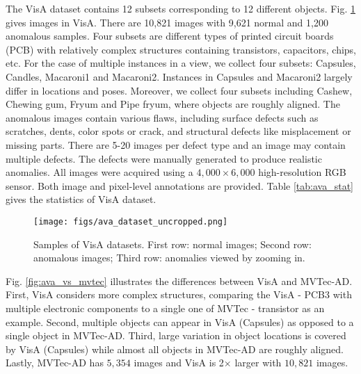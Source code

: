 \documentclass[runningheads]{llncs}
\begin{document}
The VisA dataset contains 12 subsets corresponding to 12 different objects. Fig. \ref{fig:ava_samples} gives images in VisA. There are 10,821 images with 9,621 normal and 1,200 anomalous samples. Four subsets are different types of printed circuit boards (PCB) with relatively complex structures containing transistors, capacitors, chips, etc. For the case of multiple instances in a view, we collect four subsets: Capsules, Candles, Macaroni1 and Macaroni2. Instances in Capsules and Macaroni2 largely differ in locations and poses. Moreover, we collect four subsets including Cashew, Chewing gum, Fryum and Pipe fryum, where objects are roughly aligned. The anomalous images contain various flaws, including surface defects such as scratches, dents, color spots or crack, and structural defects like misplacement or missing parts. There are 5-20 images per defect type and an image may contain multiple defects. The defects were manually generated to produce realistic anomalies. All images were acquired using a $4,000\times6,000$ high-resolution RGB sensor. Both image and pixel-level annotations are provided. Table \ref{tab:ava_stat} gives the statistics of VisA dataset. 
\begin{figure}[!t]
 \centering
\texttt{[image: figs/ava\_dataset\_uncropped.png]}
\caption{Samples of VisA datasets. First row: normal images; Second row: anomalous images; Third row: anomalies viewed by zooming in.}
\label{fig:ava_samples}
\end{figure}

Fig. \ref{fig:ava_vs_mvtec} illustrates the differences between VisA and MVTec-AD. First, VisA considers more complex structures, comparing the VisA - PCB3 with multiple electronic components to a single one of MVTec - transistor as an example. Second, multiple objects can appear in VisA (Capsules) as opposed to a single object in MVTec-AD. Third, large variation in object locations is covered by VisA (Capsules) while almost all objects in MVTec-AD are roughly aligned. Lastly, MVTec-AD has $5,354$ images and VisA is 2$\times$ larger with $10,821$ images.
\end{document}
